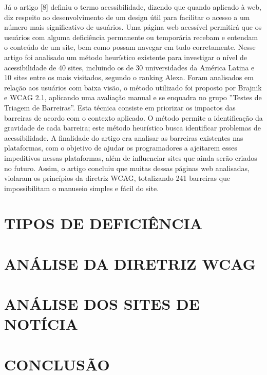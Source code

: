 \documentclass[a4paper]{article}
\begin{document}
\begin{titlepage}
Já o artigo [8] definiu o termo acessibilidade, dizendo que quando aplicado à web, diz respeito ao desenvolvimento de um design útil para facilitar o acesso a um número mais significativo de usuários. Uma página web acessível permitirá que os usuários com alguma deficiência permanente ou temporária recebam e entendam o conteúdo de um site, bem como possam navegar em tudo corretamente. Nesse artigo foi analisado um método heurístico existente para investigar o nível de acessibilidade de 40 sites, incluindo os de 30 universidades da América Latina e 10 sites entre os mais visitados, segundo o ranking Alexa. Foram analisados em relação aos usuários com baixa visão, o método utilizado foi proposto por Brajnik e WCAG 2.1, aplicando uma avaliação manual e se enquadra no grupo ''Testes de Triagem de Barreiras''. Esta técnica consiste em priorizar os impactos das barreiras de acordo com o contexto aplicado. O método permite a identificação da gravidade de cada barreira; este método heurístico busca identificar problemas de acessibilidade. A finalidade do artigo era analisar as barreiras existentes nas plataformas, com o objetivo de ajudar os programadores a ajeitarem esses impeditivos nessas plataformas, além de influenciar sites que ainda serão criados no futuro. Assim, o artigo concluiu que muitas dessas páginas web analisadas, violaram os princípios da diretriz WCAG, totalizando 241 barreiras que impossibilitam o manuseio simples e fácil do site.

\section{TIPOS DE DEFICIÊNCIA}
\section{ANÁLISE DA DIRETRIZ WCAG}
\section{ANÁLISE DOS SITES DE NOTÍCIA}
\section{CONCLUSÃO}

\end{titlepage}
\end{document}
